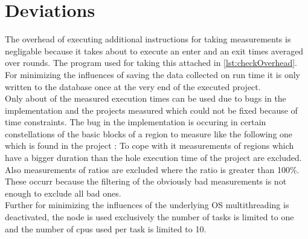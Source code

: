 \section{Deviations}
The overhead of executing additional instructions for taking measurements is negligable because it takes about \measurementOverhead to execute an enter and an exit \overheadIterations times averaged over \overheadRounds rounds.
The program used for taking this attached in \autoref{lst:checkOverhead}.\\
For minimizing the influences of saving the data collected on run time it is only written to the database once at the very end of the executed project.\\
Only about \draftnote{\usefulRatio} of the measured execution times can be used due to bugs in the implementation and the projects measured which could not be fixed because of time constraints.
The bug in the implementation is occuring in certain constellations of the basic blocks of a region to measure like the following one which is found in the project :
To cope with it measurements of regions which have a bigger duration than the hole execution time of the project are excluded.
Also measurements of ratios are excluded where the ratio is greater than 100\%.
These occurr because the filtering of the obviously bad measurements is not enough to exclude all bad ones.\\
Further for minimizing the influences of the underlying OS multithreading is deactivated, the node is used exclusively the number of tasks is limited to one and the number of cpus used per task is limited to 10.
